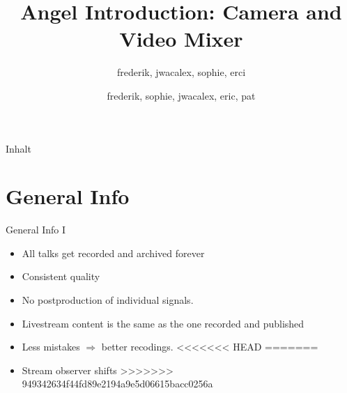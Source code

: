 \documentclass[aspectratio=169]{beamer}
\title{Angel Introduction: Camera and Video Mixer}
\author{frederik, jwacalex, sophie, erci}
\author{frederik, sophie, jwacalex, eric, pat}
\institute{C3VOC}
\begin{document}

\maketitle

\begin{frame}{Inhalt}
\tableofcontents
\end{frame}


\newpage





\section{General Info}
\begin{frame}{General Info I}
	\begin{itemize}
		\item All talks get recorded and archived forever
		\item Consistent quality
		\item No postproduction of individual signals.
		\item Livestream content is the same as the one recorded and published
		\item Less mistakes $\Rightarrow$ better recodings.
<<<<<<< HEAD
=======
		\item Stream observer shifts
>>>>>>> 949342634f44fd89e2194a9e5d06615bacc0256a
	\end{itemize}
\end{frame}
\end{document}
